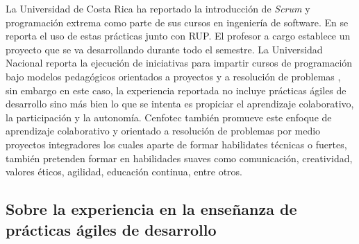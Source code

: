 \documentclass[journal]{IEEEtran}
\begin{document}
La Universidad de Costa Rica ha reportado la introducción de \emph{Scrum} y programación extrema como parte de sus cursos en ingeniería de software. En \cite{salazar} se reporta el uso de estas prácticas junto con RUP. El profesor a cargo establece un proyecto que se va desarrollando durante todo el semestre. La Universidad Nacional reporta la ejecución de iniciativas para impartir cursos de programación bajo modelos pedagógicos orientados a proyectos y a resolución de problemas \cite{mora-et-al-1, mora-et-al-2}, sin embargo en este caso, la experiencia reportada no incluye prácticas ágiles de desarrollo sino más bien lo que se intenta es propiciar el aprendizaje colaborativo, la participación y la autonomía. Cenfotec también promueve este enfoque de aprendizaje colaborativo y orientado a resolución de problemas\cite{trejos-1, cenfotec-2} por medio proyectos integradores los cuales aparte de formar habilidates técnicas o fuertes, también pretenden formar en habilidades suaves como comunicación, creatividad, valores éticos, agilidad, educación continua, entre otros.

\subsection{Sobre la experiencia en la enseñanza de prácticas ágiles de desarrollo}
\end{document}
